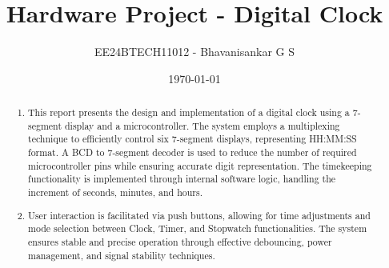 \documentclass[journal]{IEEEtran}
\title{\textbf{Hardware Project - Digital Clock}}
\author{EE24BTECH11012 - Bhavanisankar G S}
\date{\today}
\begin{document}
\maketitle
\thispagestyle{empty}

\tableofcontents

\bigspace
\renewcommand{\thefigure}{\theenumi}
\renewcommand{\thetable}{\theenumi}
\setlength{\intextsep}{10pt} %
\renewcommand{\thetable}{\theenumi}

\begin{abstract}
\begin{enumerate}
    \item This report presents the design and implementation of a digital clock using a 7-segment display and a microcontroller. The system employs a multiplexing technique to efficiently control six 7-segment displays, representing HH:MM:SS format. A BCD to 7-segment decoder is used to reduce the number of required microcontroller pins while ensuring accurate digit representation. The timekeeping functionality is implemented through internal software logic, handling the increment of seconds, minutes, and hours.
    \item User interaction is facilitated via push buttons, allowing for time adjustments and mode selection between Clock, Timer, and Stopwatch functionalities. The system ensures stable and precise operation through effective debouncing, power management, and signal stability techniques.
    \end{enumerate}
\end{abstract}

\end{document}
